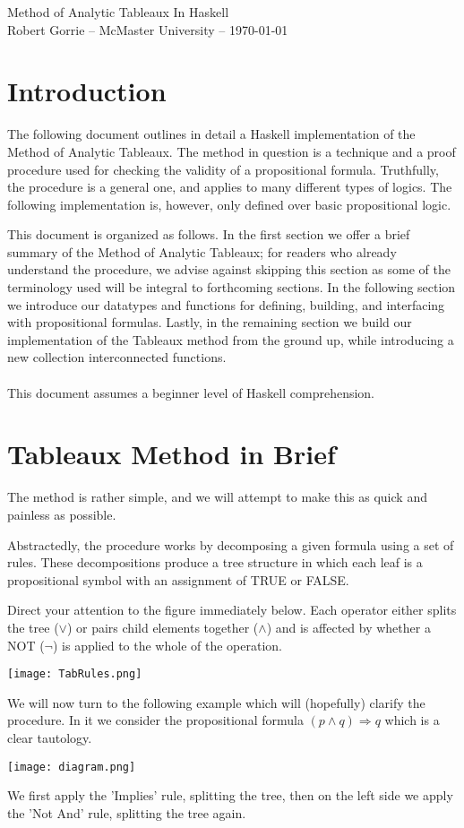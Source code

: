 \documentclass[11pt]{article}
\begin{document}
\begin{center}
\Large{Method of Analytic Tableaux In Haskell}\\
\normalsize {Robert Gorrie -- McMaster University -- \today}\\
\end{center}
\hline
{}

\section{Introduction}
The following document outlines in detail a Haskell implementation of the Method of Analytic Tableaux. The method in question is a technique and a proof procedure used for checking the validity of a propositional formula. Truthfully, the procedure is a general one, and applies to many different types of logics. The following implementation is, however, only defined over basic propositional logic.

This document is organized as follows. In the first section we offer a brief summary of the Method of Analytic Tableaux; for readers who already understand the procedure, we advise against skipping this section as some of the terminology used will be integral to forthcoming sections. In the following section we introduce our datatypes and functions for defining, building, and interfacing with propositional formulas. Lastly, in the remaining section we build our implementation of the Tableaux method from the ground up, while introducing a new collection interconnected functions.\\\\
This document assumes a beginner level of Haskell comprehension.

\section{Tableaux Method in Brief}

The method is rather simple, and we will attempt to make this as quick and painless as possible.

Abstractedly, the procedure works by decomposing a given formula using a set of rules. These decompositions produce a tree structure in which each leaf is a propositional symbol with an assignment of TRUE or FALSE.

Direct your attention to the figure immediately below. Each operator either splits the tree ($\lor$) or pairs child elements together ($\land$) and is affected by whether a NOT ($\neg$) is applied to the whole of the operation.
\begin{center}
\texttt{[image: TabRules.png]}
\end{center}
We will now turn to the following example which will (hopefully) clarify the procedure. In it we consider the propositional formula $(p \land q) \Rightarrow q$ which is a clear tautology.
\begin{center}
\texttt{[image: diagram.png]}
\end{center}
We first apply the 'Implies' rule, splitting the tree, then on the left side we apply the 'Not And' rule, splitting the tree again.\\
\end{document}
